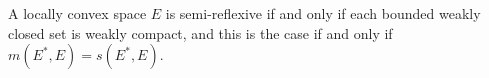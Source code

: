 A locally convex space $E$ is semi-reflexive if and only if each bounded weakly closed set is weakly compact, and this is the case if and only if $m(E^*, E) = s(E^*, E)$.
